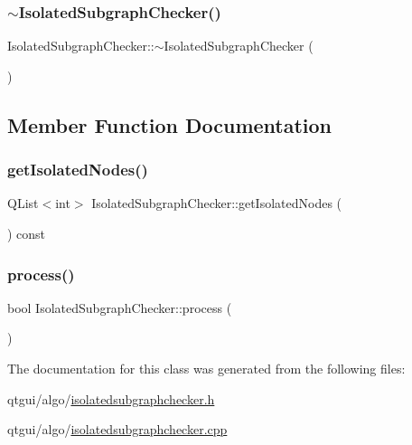 \mbox{\label{class_isolated_subgraph_checker_a59c5d47dd232d2e8d1290b1a3081e628}} 
\subsubsection{\texorpdfstring{$\sim$IsolatedSubgraphChecker()}{~IsolatedSubgraphChecker()}}
{\footnotesize\ttfamily Isolated\+Subgraph\+Checker\+::$\sim$\+Isolated\+Subgraph\+Checker (\begin{DoxyParamCaption}{ }\end{DoxyParamCaption})}



\subsection{Member Function Documentation}
\mbox{\label{class_isolated_subgraph_checker_af2119d850cc6732f828da56d85d4294a}} 
\subsubsection{\texorpdfstring{getIsolatedNodes()}{getIsolatedNodes()}}
{\footnotesize\ttfamily Q\+List$<$int$>$ Isolated\+Subgraph\+Checker\+::get\+Isolated\+Nodes (\begin{DoxyParamCaption}{ }\end{DoxyParamCaption}) const\hspace{0.3cm}{\ttfamily [inline]}}

\mbox{\label{class_isolated_subgraph_checker_a87b9dc0c9f15d04867840561413ec79c}} 
\subsubsection{\texorpdfstring{process()}{process()}}
{\footnotesize\ttfamily bool Isolated\+Subgraph\+Checker\+::process (\begin{DoxyParamCaption}{ }\end{DoxyParamCaption})}



The documentation for this class was generated from the following files\+:\begin{DoxyCompactItemize}
\item 
qtgui/algo/\mbox{\hyperlink{isolatedsubgraphchecker_8h}{isolatedsubgraphchecker.\+h}}\item 
qtgui/algo/\mbox{\hyperlink{isolatedsubgraphchecker_8cpp}{isolatedsubgraphchecker.\+cpp}}\end{DoxyCompactItemize}
